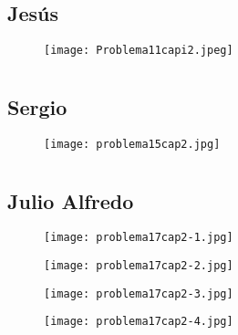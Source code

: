 \documentclass[12pt]{article}
\begin{document}
\section{ }
\subsection{{} Jesús}

\begin{figure}[htb] 
\centering \texttt{[image: Problema11capi2.jpeg]} 
\end{figure}
\newpage

\section{ }
\subsection{{} Sergio}

\begin{figure}[htb] 
\centering \texttt{[image: problema15cap2.jpg]} 
\end{figure}
\newpage

\section{ }
\subsection{{} Julio Alfredo}

\begin{figure}[htb] 
\centering \texttt{[image: problema17cap2-1.jpg]} 
\end{figure}
\newpage

\begin{figure}[htb] 
\centering \texttt{[image: problema17cap2-2.jpg]} 
\end{figure}
\newpage

\begin{figure}[htb] 
\centering \texttt{[image: problema17cap2-3.jpg]} 
\end{figure}
\newpage

\begin{figure}[htb] 
\centering \texttt{[image: problema17cap2-4.jpg]} 
\end{figure}
\newpage
\end{document}
